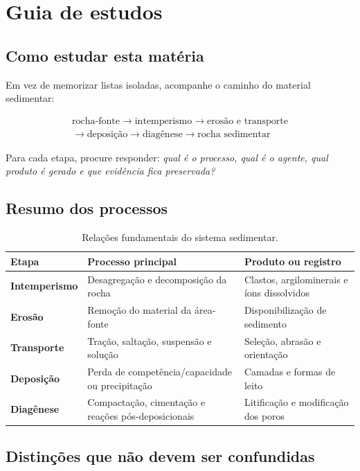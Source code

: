 \section{Guia de estudos}

\subsection{Como estudar esta matéria}

Em vez de memorizar listas isoladas, acompanhe o caminho do material sedimentar:

\[
\boxed{
\begin{gathered}
\text{rocha-fonte}
\rightarrow
\text{intemperismo}
\rightarrow
\text{erosão e transporte}
\\
\rightarrow
\text{deposição}
\rightarrow
\text{diagênese}
\rightarrow
\text{rocha sedimentar}
\end{gathered}
}
\]

Para cada etapa, procure responder: \emph{qual é o processo, qual é o agente, qual
produto é gerado e que evidência fica preservada?}

\subsection{Resumo dos processos}

\begin{table}[H]
  \centering
  \caption{Relações fundamentais do sistema sedimentar.}
  \begin{tabularx}{\textwidth}{>{\bfseries}lXX}
    \toprule
    Etapa & Processo principal & Produto ou registro \\
    \midrule
    Intemperismo & Desagregação e decomposição da rocha & Clastos, argilominerais e íons dissolvidos \\
    Erosão & Remoção do material da área-fonte & Disponibilização de sedimento \\
    Transporte & Tração, saltação, suspensão e solução & Seleção, abrasão e orientação \\
    Deposição & Perda de competência/capacidade ou precipitação & Camadas e formas de leito \\
    Diagênese & Compactação, cimentação e reações pós-deposicionais & Litificação e modificação dos poros \\
    \bottomrule
  \end{tabularx}
\end{table}

\subsection{Distinções que não devem ser confundidas}

